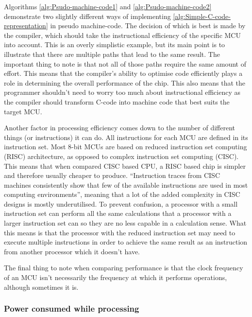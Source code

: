 Algorithms \ref{alg:Psudo-machine-code1} and \ref{alg:Psudo-machine-code2}
demonstrate two slightly different ways of implementing \ref{alg:Simple-C-code-representation}
in pseudo machine-code. The decision of which is best is made by the
compiler, which should take the instructional efficiency of the specific
MCU into account. This is an overly simplistic example, but its main
point is to illustrate that there are multiple paths that lead to
the same result. The important thing to note is that not all of those
paths require the same amount of effort. This means that the compiler's
ability to optimise code efficiently plays a role in determining the
overall performance of the chip. This also means that the programmer
shouldn't need to worry too much about instructional efficiency as
the compiler should transform C-code into machine code that best suits
the target MCU.

Another factor in processing efficiency comes down to the number of
different things (or instructions) it can do. All instructions for
each MCU are defined in its instruction set. Most 8-bit MCUs are based
on reduced instruction set computing (RISC) architecture, as opposed
to complex instruction set computing (CISC). This means that when
compared CISC based CPU, a RISC based chip is simpler and therefore
usually cheaper to produce. ``Instruction traces from CISC machines
consistently show that few of the available instructions are used
in most computing environments''\cite{ComputerArch}, meaning that
a lot of the added complexity in CISC designs is mostly underutilised.
To prevent confusion, a processor with a small instruction set can
perform all the same calculations that a processor with a larger instruction
set can so they are no less capable in a calculation sense. What this
means is that the processor with the reduced instruction set may need
to execute multiple instructions in order to achieve the same result
as an instruction from another processor which it doesn't have.

The final thing to note when comparing performance is that the clock
frequency of an MCU isn't necessarily the frequency at which it performs
operations, although sometimes it is.


\subsubsection*{Power consumed while processing}

